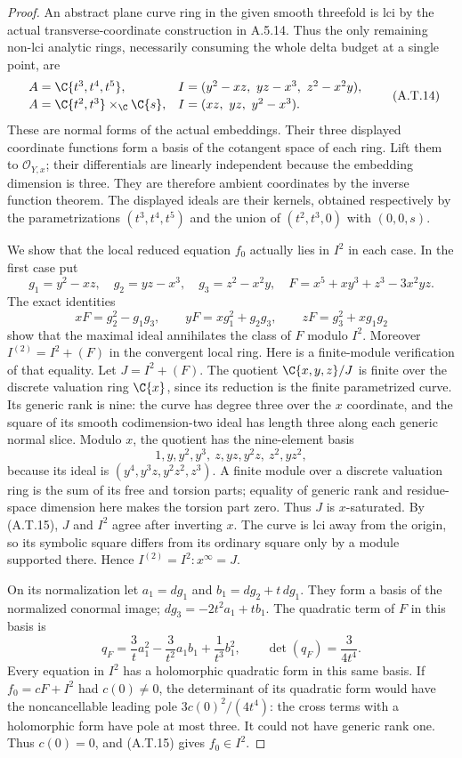 \begin{proof}
An abstract plane curve ring in the given smooth
threefold is lci by the actual transverse-coordinate
construction in A.5.14. Thus the only remaining
non-lci analytic rings, necessarily consuming the
whole delta budget at a single point, are
\[
\begin{array}{ll}
 A=\C\{t^3,t^4,t^5\},
 &I=(y^2-xz,\ yz-x^3,\ z^2-x^2y),\\[2pt]
 A=\C\{t^2,t^3\}\times_{\C}\C\{s\},
 &I=(xz,\ yz,\ y^2-x^3).
\end{array}                                             \tag{A.T.14}
\]
These are normal forms of the actual embeddings.
Their three displayed coordinate functions form a
basis of the cotangent space of each ring. Lift them
to $\mathcal O_{Y,x}$; their differentials are linearly
independent because the embedding dimension is three.
They are therefore ambient coordinates by the inverse
function theorem. The displayed ideals are their
kernels, obtained respectively by the parametrizations
$(t^3,t^4,t^5)$ and the union of $(t^2,t^3,0)$ with
$(0,0,s)$.

We show that the local reduced equation $f_0$ actually
lies in $I^2$ in each case. In the first case put
\[
 g_1=y^2-xz,\quad g_2=yz-x^3,\quad
 g_3=z^2-x^2y,\quad
 F=x^5+xy^3+z^3-3x^2yz.
\]
The exact identities
\[
 xF=g_2^2-g_1g_3,\qquad
 yF=xg_1^2+g_2g_3,\qquad
 zF=g_3^2+xg_1g_2                              \tag{A.T.15}
\]
show that the maximal ideal annihilates the class of
$F$ modulo $I^2$. Moreover
$I^{(2)}=I^2+(F)$ in the convergent local ring.
Here is a finite-module verification of that equality.
Let $J=I^2+(F)$. The quotient $\C\{x,y,z\}/J$ is
finite over the discrete valuation ring $\C\{x\}$,
since its reduction is the finite parametrized curve.
Its generic rank is nine: the curve has degree three
over the $x$ coordinate, and the square of its smooth
codimension-two ideal has length three along each
generic normal slice. Modulo $x$, the quotient has
the nine-element basis
\[
 1,y,y^2,y^3,\ z,yz,y^2z,\ z^2,yz^2,
\]
because its ideal is $(y^4,y^3z,y^2z^2,z^3)$.
A finite module over a discrete valuation ring is
the sum of its free and torsion parts; equality of
generic rank and residue-space dimension here makes
the torsion part zero. Thus $J$ is $x$-saturated.
By (A.T.15), $J$ and $I^2$ agree after inverting $x$.
The curve is lci away from the origin, so its symbolic
square differs from its ordinary square only by a
module supported there. Hence
$I^{(2)}=I^2:x^\infty=J$.

On its normalization let
$a_1=dg_1$ and $b_1=dg_2+t\,dg_1$.
They form a basis of the normalized conormal image;
$dg_3=-2t^2a_1+t b_1$.
The quadratic term of $F$ in this basis is
\[
 q_F=\frac3t a_1^2-\frac3{t^2}a_1b_1
                           +\frac1{t^3}b_1^2,
 \qquad \det(q_F)=\frac3{4t^4}.                  \tag{A.T.16}
\]
Every equation in $I^2$ has a holomorphic quadratic
form in this same basis. If $f_0=cF+I^2$ had
$c(0)\ne0$, the determinant of its quadratic form
would have the noncancellable leading pole
$3c(0)^2/(4t^4)$: the cross terms with a holomorphic
form have pole at most three. It could not have
generic rank one. Thus $c(0)=0$, and (A.T.15) gives
$f_0\in I^2$.


\end{proof}
